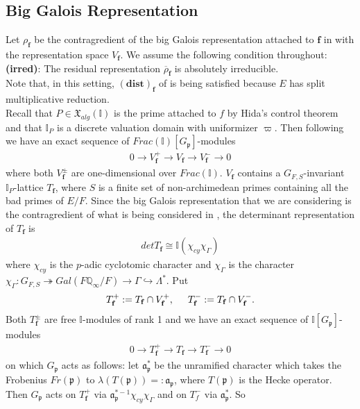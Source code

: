 \documentclass[reqno,10pt]{amsart}
\newcommand{\q}{\mathbb{Q}}
\newcommand{\I}{\mathbb{I}}
\newcommand{\f}{\mathbf{f}}
\newcommand{\ma}{\mathfrak{a}}
\newcommand{\p}{\mathfrak{p}}
\theoremstyle{plain}
\theoremstyle{definition}
\begin{document}
\subsection{Big Galois Representation} \label{BigGaloisRepresentation}
Let $\rho_\f$ be the contragredient of the big Galois representation attached to $\f$ in \cite{Hida2} with the representation space $V_\f$.
We assume the following condition throughout:
\\
\textbf{(irred)}: The residual representation $\overline{\rho}_\f$ is absolutely irreducible.
\\
Note that, in this setting,  $\mathbf{(dist)_\f}$ of \cite[Section 1.2]{Wan} is being satisfied because $E$ has split multiplicative reduction.
\\
Recall that $P \in \mathfrak{X}_{alg}(\I)$ is the prime attached to $f$ by Hida's control theorem and that $\I_P$ is a discrete valuation domain with uniformizer $\varpi$. Then following \cite[Chapter 12]{Nekovar} we have an exact sequence of $Frac(\I)[G_\p]$-modules
\begin{align*}
    0 \rightarrow V_\f^+ \rightarrow V_\f \rightarrow V_\f^- \rightarrow 0
\end{align*}
where both $V_\f^\pm$ are one-dimensional over $Frac(\I)$. $V_\f$ contains a $G_{F,S}$-invariant $\I_P$-lattice $T_\f$, where $S$ is a finite set of non-archimedean primes containing all the bad primes of $E/F$. Since the big Galois representation that we are considering is the contragredient of what is being considered in \cite{Nekovar}, the determinant representation of $T_\f$ is
\begin{align*}
    det T_\f \cong \I(\chi_{cy}\chi_\Gamma)
\end{align*}
where $\chi_{cy}$ is the $p$-adic cyclotomic character and $\chi_\Gamma$ is the character $\chi_\Gamma : G_{F,S} \twoheadrightarrow Gal(F\q_\infty/F) \rightarrow \Gamma \hookrightarrow \Lambda^*$. Put
\begin{align*}
    T_\f^+ := T_\f \cap V_\f^+, \hspace{5mm} T_\f^- := T_\f \cap V_\f^-.
\end{align*}
Both $T_\f^\pm$ are free $\I$-modules of rank 1 and we have an exact sequence of $\I[G_\p]$-modules
\begin{align*}
    0 \rightarrow T_\f^+ \rightarrow T_\f \rightarrow T_\f^- \rightarrow 0
\end{align*}
on which $G_\p$ acts as follows: let $\mathfrak{a}_\p^*$ be the unramified character which takes the Frobenius $Fr(\p)$ to $\lambda(T(\p)) =: \ma_\p$, where $T(\p)$ is the Hecke operator. Then $G_\p$ acts on $T_\f^+$ via $\ma_\p^{*-1}\chi_{cy}\chi_\Gamma$ and on $T_f^-$ via $\ma^*_\p$. So 
\end{document}

